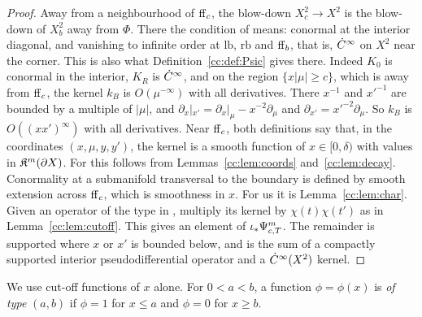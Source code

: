 \begin{proof}
Away from a neighbourhood of \(\mathrm{ff}_c\), the blow-down \(X_c^2\to X^2\) is
the blow-down of \(X_b^2\) away from \(\Phi\). There the condition of
\cite{MN} means: conormal at the interior diagonal, and vanishing to
infinite order at \(\mathrm{lb}\), \(\mathrm{rb}\) and \(\mathrm{ff}_b\), that is,
\(\dot C^\infty\) on \(X^2\) near the corner. This is also what
Definition~\ref{cc:def:Psic} gives there. Indeed \(K_0\) is conormal in
the interior, \(K_R\) is \(\dot C^\infty\), and on the region \(\{x|\mu|\ge c\}\),
which is away from \(\mathrm{ff}_c\), the kernel \(k_B\) is \(O(\mu^{-\infty})\)
with all derivatives. There \(x^{-1}\) and \(x'^{-1}\) are bounded by a
multiple of \(|\mu|\), and \(\partial_x|_{x'}=\partial_x|_\mu-
x^{-2}\partial_\mu\) and \(\partial_{x'}=x'^{-2}\partial_\mu\). So \(k_B\)
is \(O((xx')^\infty)\) with all derivatives. Near \(\mathrm{ff}_c\), both
definitions say that, in the coordinates \((x,\mu,y,y')\), the kernel is a
smooth function of \(x\in[0,\delta)\) with values in \(\mathfrak K^m(\partial
X)\). For \cite{MN} this follows from Lemmas~\ref{cc:lem:coords}
and~\ref{cc:lem:decay}. Conormality at a submanifold transversal to the
boundary is defined by smooth extension across \(\mathrm{ff}_c\), which is
smoothness in \(x\). For us it is Lemma~\ref{cc:lem:char}. Given an
operator of the type in \cite{MN}, multiply its kernel by
\(\chi(t)\chi(t')\) as in Lemma~\ref{cc:lem:cutoff}. This gives an element
of \(\iota_*\Psi_{c,T}^m\). The remainder is supported where \(x\) or \(x'\) is
bounded below, and is the sum of a compactly supported interior
pseudodifferential operator and a \(\dot C^\infty(X^2)\) kernel.
\end{proof}

We use cut-off functions of \(x\) alone. For \(0<a<b\), a function
\(\phi=\phi(x)\) is \emph{of type} \((a,b)\) if \(\phi=1\) for \(x\le a\)
and \(\phi=0\) for \(x\ge b\).

